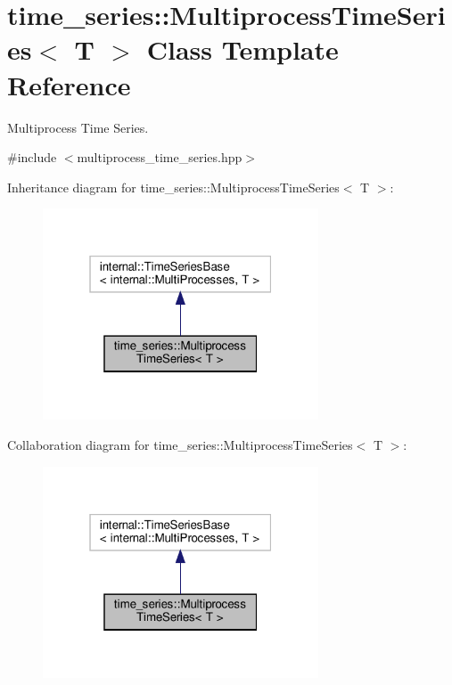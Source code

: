 \hypertarget{classtime__series_1_1MultiprocessTimeSeries}{}\section{time\+\_\+series\+:\+:Multiprocess\+Time\+Series$<$ T $>$ Class Template Reference}
\label{classtime__series_1_1MultiprocessTimeSeries}


Multiprocess Time Series.  




{\ttfamily \#include $<$multiprocess\+\_\+time\+\_\+series.\+hpp$>$}



Inheritance diagram for time\+\_\+series\+:\+:Multiprocess\+Time\+Series$<$ T $>$\+:
\nopagebreak
\begin{figure}[H]
\begin{center}
\leavevmode
\includegraphics[width=232pt]{classtime__series_1_1MultiprocessTimeSeries__inherit__graph}
\end{center}
\end{figure}


Collaboration diagram for time\+\_\+series\+:\+:Multiprocess\+Time\+Series$<$ T $>$\+:
\nopagebreak
\begin{figure}[H]
\begin{center}
\leavevmode
\includegraphics[width=232pt]{classtime__series_1_1MultiprocessTimeSeries__coll__graph}
\end{center}
\end{figure}
